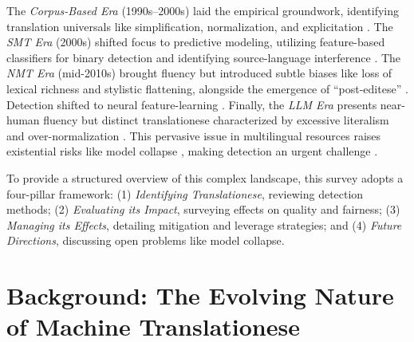 \documentclass[11pt,a4paper]{article}
\begin{document}
The \textit{Corpus-Based Era} (1990s--2000s) laid the empirical groundwork, identifying translation universals like simplification, normalization, and explicitation \cite{baker1993corpus,laviosa1998corpus}. The \textit{SMT Era} (2000s) shifted focus to predictive modeling, utilizing feature-based classifiers for binary detection and identifying source-language interference \cite{baroni2006new,volansky2015features,koppel2011translationese}. The \textit{NMT Era} (mid-2010s) brought fluency but introduced subtle biases like loss of lexical richness and stylistic flattening, alongside the emergence of ``post-editese'' \cite{vanmassenhove2018getting,toral2019post}. Detection shifted to neural feature-learning \cite{pylypenko2021comparing}. Finally, the \textit{LLM Era} presents near-human fluency but distinct translationese characterized by excessive literalism and over-normalization \cite{wang2024benchmarking}. This pervasive issue in multilingual resources \cite{church2025emerging} raises existential risks like model collapse \cite{shumailov2024ai}, making detection an urgent challenge \cite{li2025lost}.

To provide a structured overview of this complex landscape, this survey adopts a four-pillar framework: (1) \textit{Identifying Translationese}, reviewing detection methods; (2) \textit{Evaluating its Impact}, surveying effects on quality and fairness; (3) \textit{Managing its Effects}, detailing mitigation and leverage strategies; and (4) \textit{Future Directions}, discussing open problems like model collapse.

\section{Background: The Evolving Nature of Machine Translationese}
\end{document}

